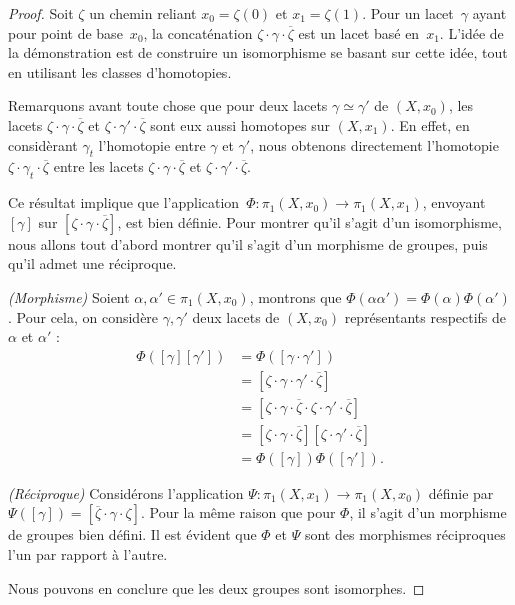 \begin{proof}
Soit $\zeta$ un chemin reliant $x_0=\zeta(0)$ et $x_1=\zeta(1)$. Pour un lacet~$\gamma$ ayant pour point de base~$x_0$, la concaténation $\zeta\cdot\gamma\cdot\overline{\zeta}$ est un lacet basé en~$x_1$. L'idée de la démonstration est de construire un isomorphisme se basant sur cette idée, tout en utilisant les classes d'homotopies.

Remarquons avant toute chose que pour deux lacets $\gamma\simeq\gamma'$ de $(X,x_0)$, les lacets $\zeta\cdot\gamma\cdot\overline{\zeta}$ et $\zeta\cdot\gamma'\cdot\overline{\zeta}$ sont eux aussi homotopes sur $(X,x_1)$. En effet, en considèrant $\gamma_t$ l'homotopie entre $\gamma$ et $\gamma'$, nous obtenons directement l'homotopie $\zeta\cdot\gamma_t\cdot\overline{\zeta}$ entre les lacets $\zeta\cdot\gamma\cdot\overline{\zeta}$ et $\zeta\cdot\gamma'\cdot\overline{\zeta}$.

Ce résultat implique que l'application~$\Phi:\pi_1(X,x_0)\to\pi_1(X,x_1)$, envoyant~$[\gamma]$ sur $[\zeta\cdot\gamma\cdot\overline{\zeta}]$, est bien définie. Pour montrer qu'il s'agit d'un isomorphisme, nous allons tout d'abord montrer qu'il s'agit d'un morphisme de groupes, puis qu'il admet une réciproque.

\bigskip \textit{(Morphisme)} Soient $\alpha,\alpha'\in\pi_1(X,x_0)$, montrons que $\Phi(\alpha\alpha')=\Phi(\alpha)\Phi(\alpha')$. Pour cela, on considère $\gamma,\gamma'$ deux lacets de $(X,x_0)$ représentants respectifs de $\alpha$ et $\alpha'$ : \[\begin{split}
\Phi([\gamma][\gamma'])&=\Phi([\gamma\cdot\gamma'])\\
&=[\zeta\cdot\gamma\cdot\gamma'\cdot\overline{\zeta}]\\
&=[\zeta\cdot\gamma\cdot\overline{\zeta}\cdot\zeta\cdot\gamma'\cdot\overline{\zeta}]\\
&=[\zeta\cdot\gamma\cdot\overline{\zeta}][\zeta\cdot\gamma'\cdot\overline{\zeta}]\\
&=\Phi([\gamma])\Phi([\gamma']).
\end{split}\]

\textit{(Réciproque)} Considérons l'application $\Psi:\pi_1(X,x_1)\to\pi_1(X,x_0)$ définie par~$\Psi([\gamma])=[\overline{\zeta}\cdot\gamma\cdot\zeta]$. Pour la même raison que pour $\Phi$, il s'agit d'un morphisme de groupes bien défini. Il est évident que $\Phi$ et $\Psi$ sont des morphismes réciproques l'un par rapport à l'autre. 

Nous pouvons en conclure que les deux groupes sont isomorphes.
\end{proof}

